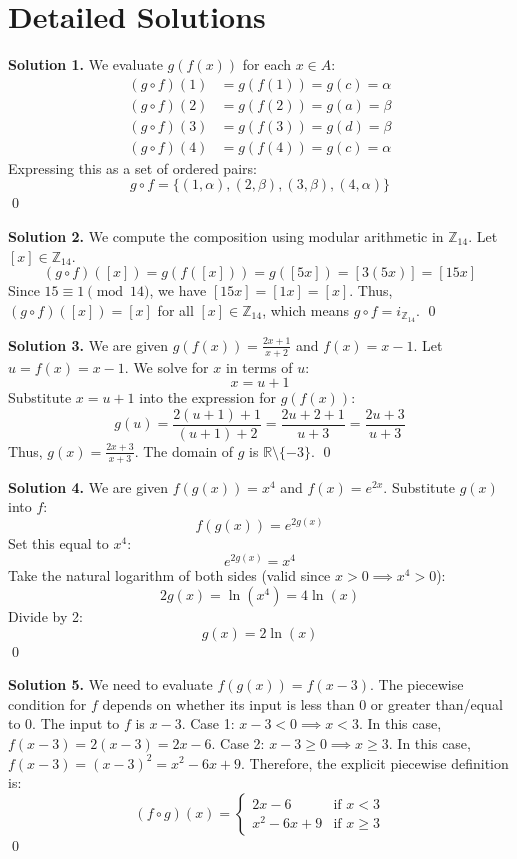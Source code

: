 \documentclass[11pt, letterpaper]{article}
\theoremstyle{definition}
\theoremstyle{remark}
\newcommand{\R}{\mathbb{R}}
\newcommand{\Z}{\mathbb{Z}}
\begin{document}
\section{Detailed Solutions}

\textbf{Solution 1.}
We evaluate $g(f(x))$ for each $x \in A$:
\begin{align*}
(g \circ f)(1) &= g(f(1)) = g(c) = \alpha \\
(g \circ f)(2) &= g(f(2)) = g(a) = \beta \\
(g \circ f)(3) &= g(f(3)) = g(d) = \beta \\
(g \circ f)(4) &= g(f(4)) = g(c) = \alpha
\end{align*}
Expressing this as a set of ordered pairs:
\[
g \circ f = \{(1, \alpha), (2, \beta), (3, \beta), (4, \alpha)\}
\]
\qed

\textbf{Solution 2.}
We compute the composition using modular arithmetic in $\Z_{14}$. Let $[x] \in \Z_{14}$.
\[
(g \circ f)([x]) = g(f([x])) = g([5x]) = [3(5x)] = [15x]
\]
Since $15 \equiv 1 \pmod{14}$, we have $[15x] = [1x] = [x]$.
Thus, $(g \circ f)([x]) = [x]$ for all $[x] \in \Z_{14}$, which means $g \circ f = i_{\Z_{14}}$.
\qed

\textbf{Solution 3.}
We are given $g(f(x)) = \frac{2x + 1}{x + 2}$ and $f(x) = x - 1$. 
Let $u = f(x) = x - 1$. We solve for $x$ in terms of $u$:
\[
x = u + 1
\]
Substitute $x = u + 1$ into the expression for $g(f(x))$:
\[
g(u) = \frac{2(u + 1) + 1}{(u + 1) + 2} = \frac{2u + 2 + 1}{u + 3} = \frac{2u + 3}{u + 3}
\]
Thus, $g(x) = \frac{2x + 3}{x + 3}$. The domain of $g$ is $\R \setminus \{-3\}$.
\qed

\textbf{Solution 4.}
We are given $f(g(x)) = x^4$ and $f(x) = e^{2x}$.
Substitute $g(x)$ into $f$:
\[
f(g(x)) = e^{2g(x)}
\]
Set this equal to $x^4$:
\[
e^{2g(x)} = x^4
\]
Take the natural logarithm of both sides (valid since $x > 0 \implies x^4 > 0$):
\[
2g(x) = \ln(x^4) = 4\ln(x)
\]
Divide by 2:
\[
g(x) = 2\ln(x)
\]
\qed

\textbf{Solution 5.}
We need to evaluate $f(g(x)) = f(x - 3)$. The piecewise condition for $f$ depends on whether its input is less than 0 or greater than/equal to 0. The input to $f$ is $x - 3$.
Case 1: $x - 3 < 0 \implies x < 3$.
In this case, $f(x - 3) = 2(x - 3) = 2x - 6$.
Case 2: $x - 3 \ge 0 \implies x \ge 3$.
In this case, $f(x - 3) = (x - 3)^2 = x^2 - 6x + 9$.
Therefore, the explicit piecewise definition is:
\[
(f \circ g)(x) = 
\begin{cases} 
2x - 6 & \text{if } x < 3 \\ 
x^2 - 6x + 9 & \text{if } x \ge 3 
\end{cases}
\]
\qed
\end{document}
